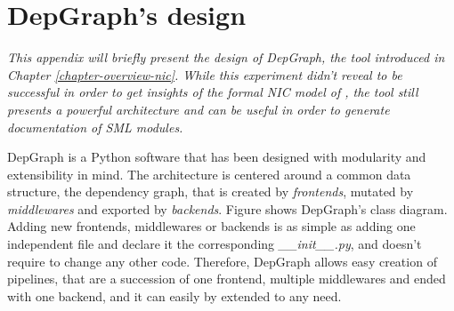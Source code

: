\documentclass{kththesis}
\begin{document}
{%



\printbibliography[heading=bibintoc]

\appendix

\chapter{DepGraph's design} \label{appendix_depgraph}
\vspace{-1cm}
\textit{This appendix will briefly present the design of DepGraph, the tool introduced in Chapter \ref{chapter-overview-nic}. While this experiment didn't reveal to be successful in order to get insights of the formal NIC model of \cite{haglund_formal_2016}, the tool still presents a powerful architecture and can be useful in order to generate documentation of \gls{SML} modules.}

DepGraph is a Python software that has been designed with modularity and extensibility in mind. The architecture is centered around a common data structure, the dependency graph, that is created by \textit{frontends}, mutated by \textit{middlewares} and exported by \textit{backends}. Figure shows DepGraph's class diagram. Adding new frontends, middlewares or backends is as simple as adding one independent file and declare it the corresponding \textit{\_\_init\_\_.py}, and doesn't require to change any other code. Therefore, DepGraph allows easy creation of pipelines, that are a succession of one frontend, multiple middlewares and ended with one backend, and it can easily by extended to any need.

}
\end{document}
